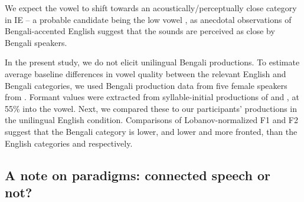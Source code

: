 \documentclass[12 pt]{article}
\newcommand{\nt}[1]{\textipa{[#1]}} %
\begin{document}
We expect the vowel \nt{2} to shift towards an acoustically/perceptually close category in IE -- a probable candidate being the low vowel \nt{a:}, as anecdotal observations of Bengali-accented English suggest that the sounds are perceived as close by Bengali speakers. 

In the present study, we do not elicit unilingual Bengali productions. To estimate average baseline differences in vowel quality between the relevant English and Bengali categories, we used Bengali production data from five female speakers from \cite{dutta2021}. Formant values were extracted from syllable-initial productions of \nt{\ae} and \nt{a:}, at 55\% into the vowel. Next, we compared these to our participants' productions in the unilingual English condition. Comparisons of Lobanov-normalized F1 and F2 suggest that the Bengali category \nt{\ae} is lower, and \nt{a:} lower and more fronted, than the English categories \nt{\ae} and \nt{2} respectively. 

\subsection{A note on paradigms: connected speech or not?} \label{paradigms}
\end{document}
